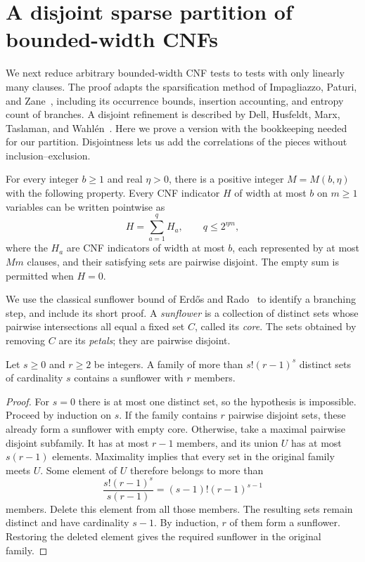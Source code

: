 \section{A disjoint sparse partition of bounded-width CNFs}
\label{sec:sparse}

We next reduce arbitrary bounded-width CNF tests to tests with only linearly
many clauses.  The proof adapts the sparsification method of Impagliazzo,
Paturi, and Zane~\cite[Section~2]{IPZ01}, including its occurrence bounds,
insertion accounting, and entropy count of branches.  A disjoint
refinement is described by Dell, Husfeldt, Marx, Taslaman, and
Wahl\'en~\cite[Appendix~A of the full version]{DHMTW14}.
Here we prove a version with the bookkeeping needed for our partition.
Disjointness
lets us add the correlations of the pieces without inclusion--exclusion.

\begin{lemma}\label{lem:sparse-partition}
For every integer $b\ge 1$ and real $\eta>0$, there is a positive integer
$M=M(b,\eta)$ with the following property.  Every CNF indicator $H$ of width
at most $b$ on $m\ge 1$ variables can be written pointwise as
\[
  H=\sum_{a=1}^{q} H_a,
  \qquad q\le 2^{\eta m},
\]
where the $H_a$ are CNF indicators of width at most $b$, each represented by
at most $Mm$ clauses, and their satisfying sets are pairwise disjoint.
The empty sum is permitted when $H=0$.
\end{lemma}

We use the classical sunflower bound of Erd\H{o}s and Rado~\cite{ER60}
to identify a branching step, and include its short proof.
A \emph{sunflower} is a collection of distinct sets whose pairwise
intersections all equal a fixed set $C$, called its \emph{core}.  The sets
obtained by removing $C$ are its \emph{petals}; they are pairwise disjoint.

\begin{lemma}\label{lem:sunflower-bound}
Let $s\ge 0$ and $r\ge 2$ be integers.  A family of more than
$s!(r-1)^s$ distinct sets of cardinality $s$ contains a sunflower with
$r$ members.
\end{lemma}

\begin{proof}
For $s=0$ there is at most one distinct set, so the hypothesis is impossible.
Proceed by induction on $s$.  If the family contains $r$ pairwise disjoint
sets, these already form a sunflower with empty core.  Otherwise, take a
maximal pairwise disjoint subfamily.  It has at most $r-1$ members, and its
union $U$ has at most $s(r-1)$ elements.  Maximality implies that every set
in the original family meets $U$.  Some element of $U$ therefore belongs
to more than
\[
  \frac{s!(r-1)^s}{s(r-1)}=(s-1)!(r-1)^{s-1}
\]
members.  Delete this element from all those members.  The resulting
sets remain distinct and have cardinality $s-1$.  By induction, $r$ of
them form a sunflower.  Restoring the deleted element gives the required
sunflower in the original family.
\end{proof}

